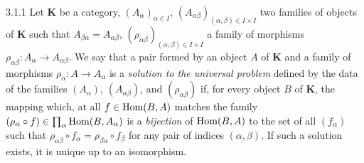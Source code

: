 \documentclass[../main.tex]{subfiles}
\begin{document}
\begin{cx}{3.1.1}
Let $\mathbf{K}$ be a category, $(A_\alpha)_{\alpha\in I}$,
$(A_{\alpha\beta})_{(\alpha,\beta)\in I\times I}$ two families of objects
of $\mathbf{K}$ such that $A_{\beta\alpha}=A_{\alpha\beta}$,
$(\rho_{\alpha\beta})_{(\alpha,\beta)\in I\times I}$ a family of morphisms
$\rho_{\alpha\beta}:A_\alpha\to A_{\alpha\beta}$. We say that a pair formed by
an object $A$ of $\mathbf{K}$ and a family of morphisms $\rho_\alpha:A\to A_\alpha$ 
is a \emph{solution to the universal problem} defined by the data of the families
$(A_\alpha)$, $(A_{\alpha\beta})$, and $(\rho_{\alpha\beta})$ if, for every object $B$
of $\mathbf{K}$, the mapping which, at all $f\in\operatorname*{Hom}(B,A)$ matches the
family $(\rho_\alpha\circ f)\in\prod_\alpha\operatorname*{Hom}(B,A_\alpha)$ is a \emph{bijection}
of $\operatorname*{Hom}(B,A)$ to the set of all $(f_\alpha)$ such that
$\rho_{\alpha\beta}\circ f_\alpha=\rho_{\beta\alpha}\circ f_\beta$ for any pair of
indices $(\alpha,\beta)$. If such a solution exists, it is unique up to an isomorphism.
\end{cx}
\end{document}
